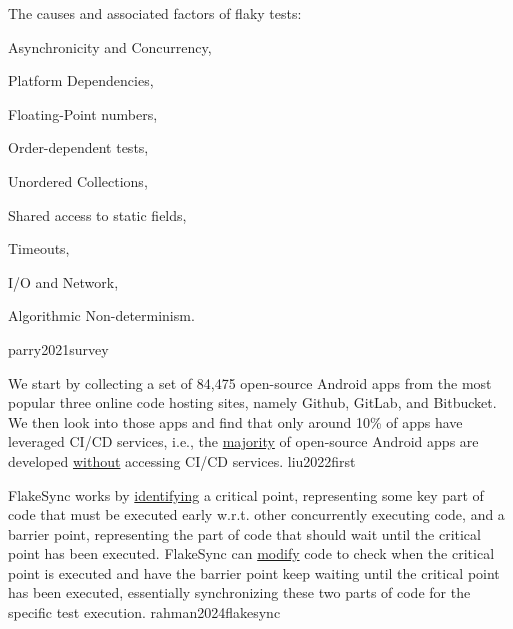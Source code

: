 \documentclass{article}
\begin{document}
  {The causes and associated factors of flaky tests: \begin{enumerate*}
    \item Asynchronicity and Concurrency,
    \item Platform Dependencies,
    \item Floating-Point numbers,
    \item Order-dependent tests,
    \item Unordered Collections,
    \item Shared access to static fields,
    \item Timeouts,
    \item I/O and Network,
    \item Algorithmic Non-determinism.
  \end{enumerate*}}
  {parry2021survey}

  {We start by collecting a set of 84,475 open-source Android apps from the most popular three online code hosting sites, namely Github, GitLab, and Bitbucket. We then look into those apps and find that only around 10\% of apps have leveraged CI/CD services, i.e., the \ul{majority} of open-source Android apps are developed \ul{without} accessing CI/CD services.}
  {liu2022first}

  {FlakeSync works by \ul{identifying} a critical point, representing some key part of code that must be executed early w.r.t. other concurrently executing code, and a barrier point, representing the part of code that should wait until the critical point has been executed. FlakeSync can \ul{modify} code to check when the critical point is executed and have the barrier point keep waiting until the critical point has been executed, essentially synchronizing these two parts of code for the specific test execution.}
  {rahman2024flakesync}
\end{document}
